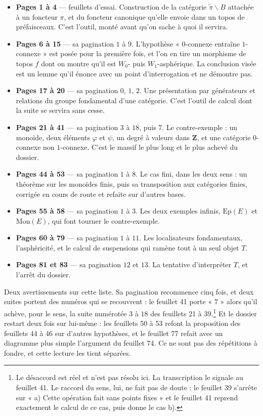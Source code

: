 \documentclass[11pt,a4paper]{article}
\begin{document}
\begin{itemize}
\item \textbf{Pages 1 à 4} — feuillets d'essai. Construction de la catégorie
$\widetilde{\pi}\backslash B$ attachée à un foncteur $\pi$, et du foncteur
canonique qu'elle envoie dans un topos de préfaisceaux. C'est l'outil, monté
avant qu'on sache à quoi il servira.
\item \textbf{Pages 6 à 15} — sa pagination $1$ à $9$. L'hypothèse
« $0$-connexe entraîne $1$-connexe » est posée pour la première fois, et l'on
en tire un morphisme de topos $f$ dont on montre qu'il est
$W_{0}$- puis $W_{1}$-asphérique. La conclusion visée est un lemme qu'il
énonce avec un point d'interrogation et ne démontre pas.
\item \textbf{Pages 17 à 20} — sa pagination $0$, $1$, $2$. Une présentation
par générateurs et relations du groupe fondamental d'une catégorie. C'est
l'outil de calcul dont la suite se servira sans cesse.
\item \textbf{Pages 21 à 41} — sa pagination $3$ à $18$, puis $7$. Le
contre-exemple : un monoïde, deux éléments $\varphi$ et $\psi$, un degré à
valeurs dans $\mathbf{Z}$, et une catégorie $0$-connexe non $1$-connexe. C'est
le massif le plus long et le plus achevé du dossier.
\item \textbf{Pages 44 à 53} — sa pagination $1$ à $8$. Le cas fini, dans les
deux sens : un théorème sur les monoïdes finis, puis sa transposition aux
catégories finies, corrigée en cours de route et refaite sur d'autres bases.
\item \textbf{Pages 55 à 58} — sa pagination $1$ à $3$. Les deux exemples
infinis, $\mathrm{Ep}(E)$ et $\mathrm{Mon}(E)$, qui font tourner le
contre-exemple.
\item \textbf{Pages 60 à 79} — sa pagination $1$ à $11$. Les localisateurs
fondamentaux, l'asphéricité, et le calcul de suspensions qui ramène tout à un
seul objet $T$.
\item \textbf{Pages 81 et 83} — sa pagination $12$ et $13$. La tentative
d'interpréter $T$, et l'arrêt du dossier.
\end{itemize}

Deux avertissements sur cette liste. Sa pagination recommence cinq fois, et
deux suites portent des numéros qui se recouvrent : le feuillet 41 porte
« $7$ » alors qu'il achève, pour le sens, la suite numérotée $3$ à $18$ des
feuillets 21 à 39.\footnote{Le désaccord est réel et n'est pas résolu ici. La
transcription le signale au feuillet 41. Le raccord du sens, lui, ne fait pas
de doute : le feuillet 39 s'arrête sur « a) Cette opération fait sans points
fixes » et le feuillet 41 reprend exactement le calcul de ce cas, puis donne
le cas b).} Et le dossier restart deux fois sur lui-même : les feuillets 50 à
53 refont la proposition des feuillets 44 à 46 sur d'autres hypothèses, et le
feuillet 77 refait avec un diagramme plus simple l'argument du feuillet 74.
Ce ne sont pas des répétitions à fondre, et cette lecture les tient séparées.
\end{document}
